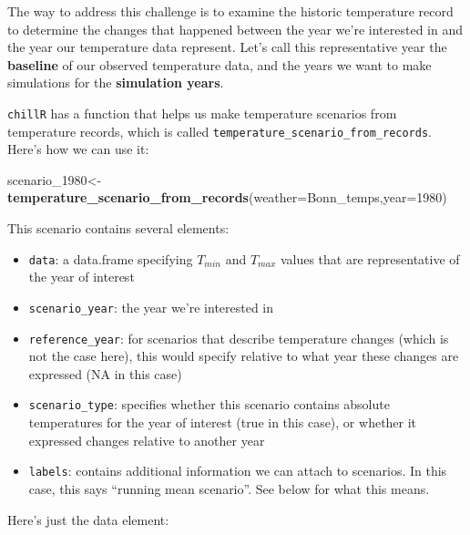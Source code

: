 \documentclass[
]{book}
\newenvironment{Shaded}{\begin{snugshade}}{\end{snugshade}}
\newcommand{\DataTypeTok}[1]{\textcolor[rgb]{0.13,0.29,0.53}{#1}}
\newcommand{\DecValTok}[1]{\textcolor[rgb]{0.00,0.00,0.81}{#1}}
\newcommand{\KeywordTok}[1]{\textcolor[rgb]{0.13,0.29,0.53}{\textbf{#1}}}
\newcommand{\NormalTok}[1]{#1}
\newcommand{\OperatorTok}[1]{\textcolor[rgb]{0.81,0.36,0.00}{\textbf{#1}}}
\newcommand{\StringTok}[1]{\textcolor[rgb]{0.31,0.60,0.02}{#1}}
\providecommand{\tightlist}{%
  \setlength{\itemsep}{0pt}\setlength{\parskip}{0pt}}
\begin{document}
The way to address this challenge is to examine the historic temperature record to determine the changes that happened between the year we're interested in and the year our temperature data represent. Let's call this representative year the \textbf{baseline} of our observed temperature data, and the years we want to make simulations for the \textbf{simulation years}.

\texttt{chillR} has a function that helps us make temperature scenarios from temperature records, which is called \texttt{temperature\_scenario\_from\_records}. Here's how we can use it:

\begin{Shaded}
\begin{Highlighting}[]
\NormalTok{scenario_}\DecValTok{1980}\NormalTok{<-}\KeywordTok{temperature_scenario_from_records}\NormalTok{(}\DataTypeTok{weather=}\NormalTok{Bonn_temps,}\DataTypeTok{year=}\DecValTok{1980}\NormalTok{)}
\end{Highlighting}
\end{Shaded}

This scenario contains several elements:

\begin{itemize}
\tightlist
\item
  \texttt{data}: a data.frame specifying \(T_{min}\) and \(T_{max}\) values that are representative of the year of interest
\item
  \texttt{scenario\_year}: the year we're interested in
\item
  \texttt{reference\_year}: for scenarios that describe temperature changes (which is not the case here), this would specify relative to what year these changes are expressed (NA in this case)
\item
  \texttt{scenario\_type}: specifies whether this scenario contains absolute temperatures for the year of interest (true in this case), or whether it expressed changes relative to another year
\item
  \texttt{labels}: contains additional information we can attach to scenarios. In this case, this says ``running mean scenario''. See below for what this means.
\end{itemize}

Here's just the data element:

\begin{Shaded}
\end{Shaded}
\end{document}
